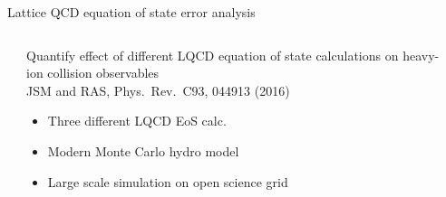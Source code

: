 \documentclass[xcolor=dvipsnames, aspectratio=169]{beamer}
\begin{document}
\begin{frame}[t,plain]{Lattice QCD equation of state error analysis}
    \vspace{0.6cm}
    \begin{columns}[t]
        \begin{column}{0.025\textwidth}
        \end{column}
        \begin{column}{0.575\textwidth}
            {\small Quantify effect of different LQCD equation of state 
                   calculations on heavy-ion collision observables}\\
            \smallskip
            {\scriptsize JSM and RAS, Phys.\ Rev.\ C93, 044913 (2016)}
            \smallskip
            \begin{itemize}
                \small
                \item Three different LQCD EoS calc.
                \item Modern Monte Carlo hydro model
                \item Large scale simulation on open science grid
            \end{itemize}
            \medskip
        \end{column}
        \begin{column}{0.4\textwidth}
            \bigskip
            \begin{tikzpicture}

\end{tikzpicture}
\end{column}
\end{columns}
\end{frame}
\end{document}
